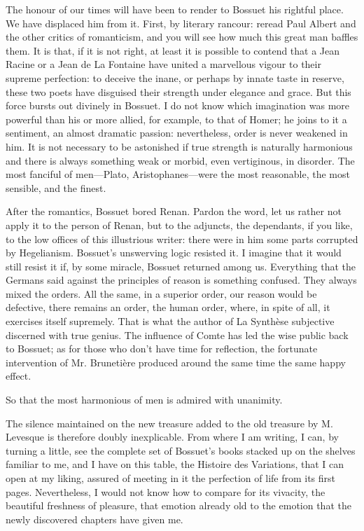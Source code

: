 The honour of our times will have been to render to Bossuet his rightful place. We have displaced him from it. First, by literary rancour: reread Paul Albert and the other critics of romanticism, and you will see how much this great man baffles them. It is that, if it is not right, at least it is possible to contend that a Jean Racine or a Jean de La Fontaine have united a marvellous vigour to their supreme perfection: to deceive the inane, or perhaps by innate taste in reserve, these two poets have disguised their strength under elegance and grace. But this force bursts out divinely in Bossuet. I do not know which imagination was more powerful than his or more allied, for example, to that of Homer; he joins to it a sentiment, an almost dramatic passion: nevertheless, order is never weakened in him. It is not necessary to be astonished if true strength is naturally harmonious and there is always something weak or morbid, even vertiginous, in disorder. The most fanciful of men—Plato, Aristophanes—were the most reasonable, the most sensible, and the finest.

After the romantics, Bossuet bored Renan. Pardon the word, let us rather not apply it to the person of Renan, but to the adjuncts, the dependants, if you like, to the low offices of this illustrious writer: there were in him some parts corrupted by Hegelianism. Bossuet's unswerving logic resisted it. I imagine that it would still resist it if, by some miracle, Bossuet returned among us. Everything that the Germans said against the principles of reason is something confused. They always mixed the orders. All the same, in a superior order, our reason would be defective, there remains an order, the human order, where, in spite of all, it exercises itself supremely. That is what the author of La Synthèse subjective discerned with true genius. The influence of Comte has led the wise public back to Bossuet; as for those who don’t have time for reflection, the fortunate intervention of Mr. Brunetière produced around the same time the same happy effect.

So that the most harmonious of men is admired with unanimity.

The silence maintained on the new treasure added to the old treasure by M. Levesque is therefore doubly inexplicable. From where I am writing, I can, by turning a little, see the complete set of Bossuet’s books stacked up on the shelves familiar to me, and I have on this table, the Histoire des Variations, that I can open at my liking, assured of meeting in it the perfection of life from its first pages. Nevertheless, I would not know how to compare for its vivacity, the beautiful freshness of pleasure, that emotion already old to the emotion that the newly discovered chapters have given me.

